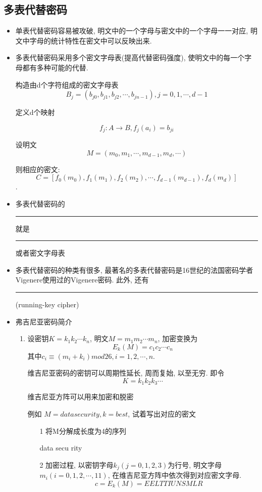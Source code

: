 \documentclass[UTF8]{ctexart}
\newcommand\hl{\bgroup\markoverwith
  {\textcolor{yellow}{\rule[-.5ex]{2pt}{2.5ex}}}\ULon}
\begin{document}
    \subsection{多表代替密码}
    \begin{itemize}
        \item 单表代替密码容易被攻破, 明文中的一个字母与密文中的一个字母一一对应, 明文中字母的统计特性在密文中可以反映出来.
        \item 多表代替密码采用多个密文字母表(提高代替密码强度), 使明文中的每一个字母都有多种可能的代替.

        构造由d个字符组成的密文字母表
        $$B_j=(b_{j0}, b_{j1}, b_{j2}, \cdots, b_{jn-1}), j=0,1, \cdots, d-1$$

        定义d个映射

        $$f_j: A\rightarrow B, f_j(a_i)=b_{ji}$$

        设明文
        $$M=(m_0, m_1, \cdots, m_{d-1}, m_d, \cdots)$$

        则相应的密文:
        $$C=[f_0(m_0), f_1(m_1), f_2(m_2), \cdots, f_{d-1}(m_{d-1}), f_d(m_d)]$$.

        \item 多表代替密码的\hl{密钥}就是\hl{d个映射}或者密文字母表
        \item 多表代替密码的种类有很多, 最著名的多表代替密码是16世纪的法国密码学者Vigenere使用过的Vigenere密码.
        此外, 还有\hl{游动钥密码}(running-key cipher)

        \item 弗吉尼亚密码简介
        \begin{enumerate}
            \item 设密钥$K=k_1k_2\cdots k_n$, 明文$M=m_1m_2\cdots m_n$, 加密变换为
            $$E_k(M)=c_1c_2\cdots c_n$$
            其中$c_i\equiv (m_i+k_i)mod26, i=1, 2,\cdots, n$.

            维吉尼亚密码的密钥可以周期性延长, 周而复始, 以至无穷. 即令
            $$K=k_1k_2k_3\cdots$$

            维吉尼亚方阵可以用来加密和脱密

            例如 $M=data security, k=best$, 试着写出对应的密文
            \begin{itemize}
                \item [1] 将M分解成长度为4的序列

                data secu rity

                \item [2] 加密过程, 以密钥字母$k_j(j=0, 1, 2, 3)$为行号, 明文字母$m_i(i=0, 1, 2, \cdots, 11)$, 在维吉尼亚方阵中依次得到对应密文字母.
                $$c=E_k(M)=EELT TIUN SMLR$$


\end{itemize}
\end{enumerate}
\end{itemize}
\end{document}
